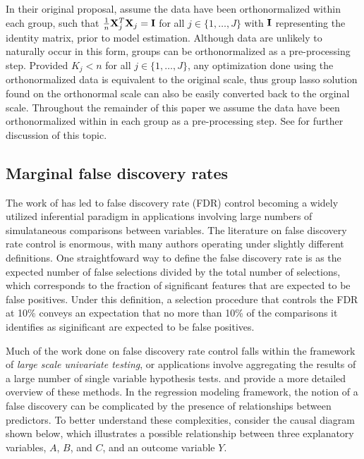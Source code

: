 In their original proposal, \citet{Yuan2006} assume the data have been orthonormalized within each group, such that $\tfrac{1}{n}\mathbf{X}_j^T\mathbf{X}_j = \mathbf{I}$ for all $j \in \{1, \ldots, J\}$ with $\mathbf{I}$ representing the identity matrix, prior to model estimation.  Although data are unlikely to naturally occur in this form, groups can be orthonormalized as a pre-processing step.  Provided $K_j < n$ for all $j \in \{1, \ldots, J\}$, any optimization done using the orthonormalized data is equivalent to the original scale, thus group lasso solution found on the orthonormal scale can also be easily converted back to the orginal scale.  Throughout the remainder of this paper we assume the data have been orthonormalized within in each group as a pre-processing step. See \citet{Simon2012} for further discussion of this topic.


\subsection{Marginal false discovery rates}

The work of \citet{BH_1995} has led to false discovery rate (FDR) control becoming a widely utilized inferential paradigm in applications involving large numbers of simulataneous comparisons between variables.  The literature on false discovery rate control is enormous, with many authors operating under slightly different definitions.  One straightfoward way to define the false discovery rate is as the expected number of false selections divided by the total number of selections, which corresponds to the fraction of significant features that are expected to be false positives.  Under this definition, a selection procedure that controls the FDR at 10\% conveys an expectation that no more than 10\% of the comparisons it identifies as siginificant are expected to be false positives.  

Much of the work done on false discovery rate control falls within the framework of \textit{large scale univariate testing}, or applications involve aggregating the results of a large number of single variable hypothesis tests.  \citet{Farcomeni2008} and \citet{Strimmer2008} provide a more detailed overview of these methods.  In the regression modeling framework, the notion of a false discovery can be complicated by the presence of relationships between predictors.  To better understand these complexities, consider the causal diagram shown below, which illustrates a possible relationship between three explanatory variables, $A$, $B$, and $C$, and an outcome variable $Y$.

